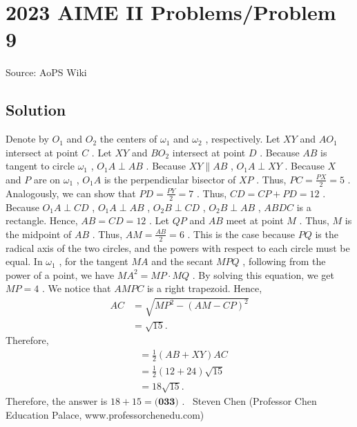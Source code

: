 \documentclass[12pt]{article}
\begin{document}
\section*{{2023 AIME II Problems/Problem 9}}
Source: AoPS Wiki

\subsection*{Solution}
Denote by $O_1$ and $O_2$ the centers of $\omega_1$ and $\omega_2$ , respectively.
Let $XY$ and $AO_1$ intersect at point $C$ .
Let $XY$ and $BO_2$ intersect at point $D$ . Because $AB$ is tangent to circle $\omega_1$ , $O_1 A \perp AB$ .
Because $XY \parallel AB$ , $O_1 A \perp XY$ .
Because $X$ and $P$ are on $\omega_1$ , $O_1A$ is the perpendicular bisector of $XP$ .
Thus, $PC = \frac{PX}{2} = 5$ . Analogously, we can show that $PD = \frac{PY}{2} = 7$ . Thus, $CD = CP + PD = 12$ .
Because $O_1 A \perp CD$ , $O_1 A \perp AB$ , $O_2 B \perp CD$ , $O_2 B \perp AB$ , $ABDC$ is a rectangle. Hence, $AB = CD = 12$ . Let $QP$ and $AB$ meet at point $M$ .
Thus, $M$ is the midpoint of $AB$ .
Thus, $AM = \frac{AB}{2} = 6$ . This is the case because $PQ$ is the radical axis of the two circles, and the powers with respect to each circle must be equal. In $\omega_1$ , for the tangent $MA$ and the secant $MPQ$ , following from the power of a point, we have $MA^2 = MP \cdot MQ$ .
By solving this equation, we get $MP = 4$ . We notice that $AMPC$ is a right trapezoid.
Hence, \begin{align*} AC & = \sqrt{MP^2 - \left( AM - CP \right)^2} \\ & = \sqrt{15} . \end{align*} Therefore, \begin{align*} [XABY] & = \frac{1}{2} \left( AB + XY \right) AC \\ & = \frac{1}{2} \left( 12 + 24 \right) \sqrt{15} \\ & = 18 \sqrt{15}. \end{align*} Therefore, the answer is $18 + 15 = \boxed{\textbf{(033)}}$ . ~Steven Chen (Professor Chen Education Palace, www.professorchenedu.com)
\end{document}
